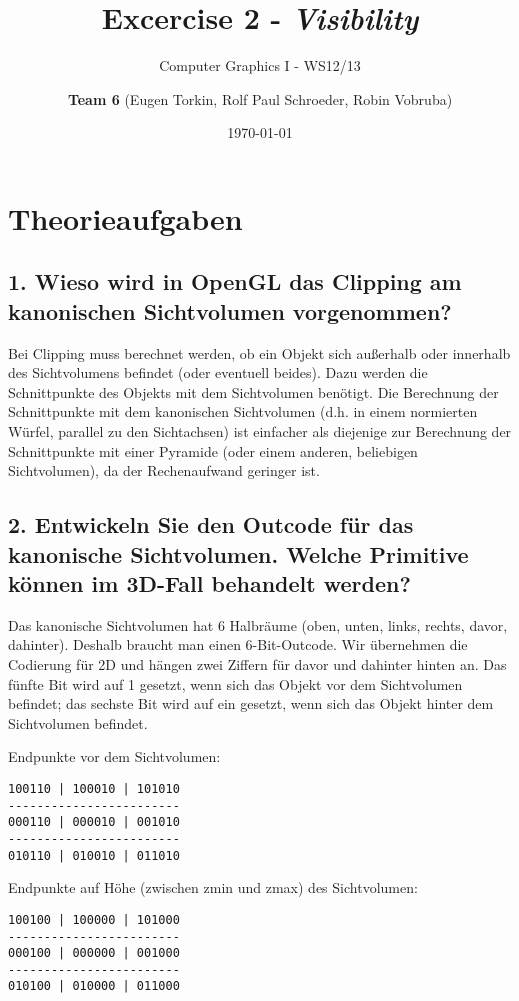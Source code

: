 \documentclass[a4paper,headings=small]{scrartcl}
\title{Excercise 2 - \emph{Visibility}}
\subtitle{Computer Graphics I - WS12/13}
\author{\textbf{Team 6} (Eugen Torkin, Rolf Paul Schroeder, Robin Vobruba)}
\date{\today}
\numberwithin{equation}{section} %
\numberwithin{figure}{section}   %
\begin{document}
\maketitle


\section{Theorieaufgaben}

\subsection{1. Wieso wird in OpenGL das Clipping am kanonischen Sichtvolumen vorgenommen?}

Bei Clipping muss berechnet werden, ob ein Objekt sich außerhalb oder innerhalb des Sichtvolumens befindet (oder eventuell beides). Dazu werden die Schnittpunkte des Objekts mit dem Sichtvolumen benötigt. Die Berechnung der Schnittpunkte mit dem kanonischen Sichtvolumen (d.h. in einem normierten Würfel, parallel zu den Sichtachsen) ist einfacher als diejenige zur Berechnung der Schnittpunkte mit einer Pyramide (oder einem anderen, beliebigen Sichtvolumen), da der Rechenaufwand geringer ist.

\subsection{2. Entwickeln Sie den Outcode für das kanonische Sichtvolumen. Welche Primitive können im 3D-Fall behandelt werden?}

Das kanonische Sichtvolumen hat 6 Halbräume (oben, unten, links, rechts, davor, dahinter). Deshalb braucht man einen 6-Bit-Outcode. Wir übernehmen die Codierung für 2D und hängen zwei Ziffern für davor und dahinter hinten an. Das fünfte Bit wird auf 1 gesetzt, wenn sich das Objekt vor dem Sichtvolumen befindet; das sechste Bit wird auf ein gesetzt, wenn sich das Objekt hinter dem Sichtvolumen befindet.

Endpunkte vor dem Sichtvolumen:
\begin{verbatim}
100110 | 100010 | 101010
------------------------
000110 | 000010 | 001010
------------------------
010110 | 010010 | 011010
\end{verbatim}

Endpunkte auf Höhe (zwischen zmin und zmax) des Sichtvolumen:
\begin{verbatim}
100100 | 100000 | 101000
------------------------
000100 | 000000 | 001000
------------------------
010100 | 010000 | 011000
\end{verbatim}
\end{document}
